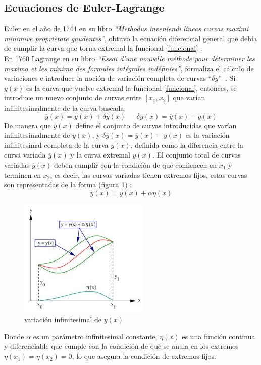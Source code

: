 \documentclass[a4paper,12pt]{article}
\begin{document}
\subsection{Ecuaciones de Euler-Lagrange}
Euler en el año de 1744 en su libro  \textit{``Methodus inveniendi lineas curvas maximi minimive proprietate gaudentes''}, obtuvo la ecuación diferencial general que debía de cumplir la curva que torna extremal la funcional \eqref{funcional} \cite{luzvar}.
\\

En 1760 Lagrange en su libro \textit{``Essai d’une nouvelle méthode pour déterminer les maxima et les minima des formules intégrales indéfinies''}, formaliza el cálculo de variaciones e introduce la noción de variación completa de curvas \mbox{``$\delta y$'' \cite{hamilton,luzvar}.} \mbox{Si $y(x)$} es la curva que vuelve extremal la funcional \eqref{funcional}, entonces, se introduce un nuevo conjunto de curvas entre $[x_1,x_2]$ que varían infinitesimalmente de la curva buscada: 
\begin{equation}
\overline{y}(x)=y(x)+\delta y(x) \ \ \ \ \ \ \ \delta y(x)=\overline{y}(x)-y(x) 
\label{familias} 
\end{equation}
De manera que $\overline{y}(x)$ define el conjunto de curvas introducidas que varían \mbox{infinitesimalmente} de $y(x)$, y $\delta y(x)=\overline{y}(x)-y(x)$ es la variación infinitesimal \mbox{completa} de la curva $y(x)$, definida como la diferencia entre la curva variada $\overline{y}(x)$ y la curva extremal $y(x)$. El conjunto total de curvas variadas $\overline{y}(x)$ deben cumplir con la condición de que comiencen en $x_1$ y terminen en $x_2$, es decir, las curvas variadas tienen extremos fijos, estas curvas son representadas de la forma (figura \ref{lag}) \cite{hamilton}:
\begin{equation}
\overline{y}(x)=y(x)+\alpha\eta(x)
\label{cur} 
\end{equation}
\begin{figure}[H]
\centering
\includegraphics[width=0.3 \textwidth]{images.jpg}
\caption{variación infinitesimal de $y(x)$}
\label{lag}
\end{figure}
Donde $\alpha$ es un parámetro infinitesimal constante, $\eta(x)$ es una función \mbox{continua} y diferenciable que cumple con la condición de que se anula en los \mbox{extremos $\eta(x_1)=\eta(x_2)=0$,} lo que asegura la condición de extremos fijos. 
\\
\end{document}
